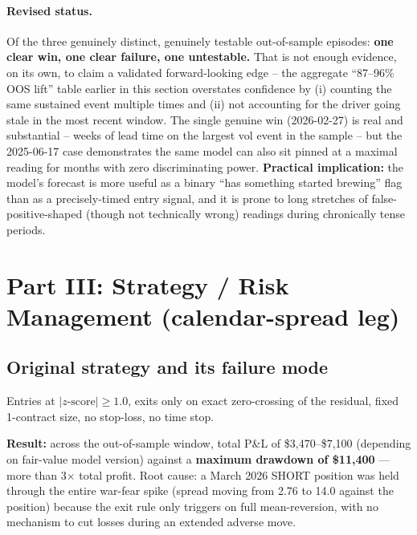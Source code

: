 \documentclass[11pt]{article}
\begin{document}
\paragraph{Revised status.} Of the three genuinely distinct, genuinely
testable out-of-sample episodes: \textbf{one clear win, one clear failure,
one untestable.} That is not enough evidence, on its own, to claim a
validated forward-looking edge -- the aggregate ``87--96\% OOS lift''
table earlier in this section overstates confidence by (i) counting the
same sustained event multiple times and (ii) not accounting for the driver
going stale in the most recent window. The single genuine win
(2026-02-27) is real and substantial -- weeks of lead time on the largest
vol event in the sample -- but the 2025-06-17 case demonstrates the same
model can also sit pinned at a maximal reading for months with zero
discriminating power. \textbf{Practical implication:} the model's forecast
is more useful as a binary ``has something started brewing'' flag than as
a precisely-timed entry signal, and it is prone to long stretches of
false-positive-shaped (though not technically wrong) readings during
chronically tense periods.

\section{Part III: Strategy / Risk Management (calendar-spread leg)}

\subsection{Original strategy and its failure mode}
Entries at $|z\text{-score}| \geq 1.0$, exits only on exact zero-crossing of
the residual, fixed 1-contract size, no stop-loss, no time stop.

\textbf{Result:} across the out-of-sample window, total P\&L of
\$3{,}470--\$7{,}100 (depending on fair-value model version) against a
\textbf{maximum drawdown of \$11{,}400} --- more than 3$\times$ total
profit. Root cause: a March 2026 SHORT position was held through the entire
war-fear spike (spread moving from 2.76 to 14.0 against the position)
because the exit rule only triggers on full mean-reversion, with no
mechanism to cut losses during an extended adverse move.
\end{document}
